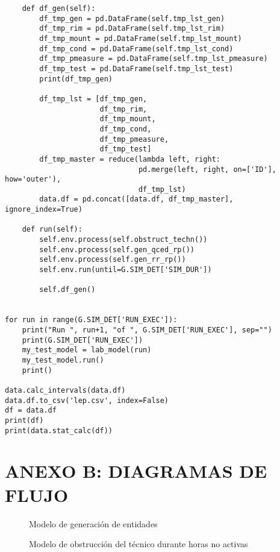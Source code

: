 \begin{verbatim}
    def df_gen(self):
        df_tmp_gen = pd.DataFrame(self.tmp_lst_gen)
        df_tmp_rim = pd.DataFrame(self.tmp_lst_rim)
        df_tmp_mount = pd.DataFrame(self.tmp_lst_mount)
        df_tmp_cond = pd.DataFrame(self.tmp_lst_cond)
        df_tmp_pmeasure = pd.DataFrame(self.tmp_lst_pmeasure)
        df_tmp_test = pd.DataFrame(self.tmp_lst_test)
        print(df_tmp_gen)

        df_tmp_lst = [df_tmp_gen,
                      df_tmp_rim,
                      df_tmp_mount,
                      df_tmp_cond,
                      df_tmp_pmeasure,
                      df_tmp_test]
        df_tmp_master = reduce(lambda left, right:
                               pd.merge(left, right, on=['ID'], how='outer'),
                               df_tmp_lst)
        data.df = pd.concat([data.df, df_tmp_master], ignore_index=True)

    def run(self):
        self.env.process(self.obstruct_techn())
        self.env.process(self.gen_qced_rp())
        self.env.process(self.gen_rr_rp())
        self.env.run(until=G.SIM_DET['SIM_DUR'])

        self.df_gen()


for run in range(G.SIM_DET['RUN_EXEC']):
    print("Run ", run+1, "of ", G.SIM_DET['RUN_EXEC'], sep="")
    print(G.SIM_DET['RUN_EXEC'])
    my_test_model = lab_model(run)
    my_test_model.run()
    print()

data.calc_intervals(data.df)
data.df.to_csv('lep.csv', index=False)
df = data.df
print(df)
print(data.stat_calc(df))

\end{verbatim}
\newpage

\section{ANEXO B: DIAGRAMAS DE FLUJO}\label{apnd3}

\begin{figure}[H]
	\begin{center}
		
	\end{center}
	\caption{Modelo de generación de entidades}
\end{figure}

\begin{figure}[H]
	\begin{center}
		
	\end{center}
	\caption{Modelo de obstrucción del técnico durante horas no activas}
\end{figure}

